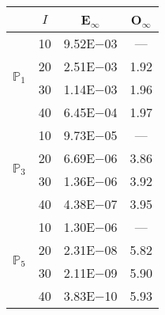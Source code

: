 \begin{table}[H]
\centering
\begin{tabular}{@{}l c c c@{}}
\toprule
 & $I$ & E$_{\infty}$ & O$_{\infty}$\\
\midrule
\multirow{4}{*}{$\mathbb{P}_{1}$}
 & 10 & 9.52E$-$03 & ---\\
 & 20 & 2.51E$-$03 & 1.92  \\
 & 30 & 1.14E$-$03 & 1.96  \\
 & 40 & 6.45E$-$04 & 1.97  \\
\midrule
\multirow{4}{*}{$\mathbb{P}_{3}$}
 & 10 & 9.73E$-$05 & ---\\
 & 20 & 6.69E$-$06 & 3.86  \\
 & 30 & 1.36E$-$06 & 3.92  \\
 & 40 & 4.38E$-$07 & 3.95  \\
\midrule
\multirow{4}{*}{$\mathbb{P}_{5}$}
 & 10 & 1.30E$-$06 & ---\\
 & 20 & 2.31E$-$08 & 5.82  \\
 & 30 & 2.11E$-$09 & 5.90  \\
 & 40 & 3.83E$-$10 & 5.93  \\
\bottomrule
\end{tabular}
\end{table}
